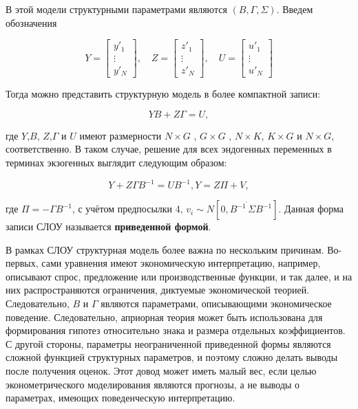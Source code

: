 В этой модели структурными параметрами являются  $(B,\Gamma,\Sigma)$. Введем обозначения

\[
Y=\begin{bmatrix} y'_{1} \\ \vdots \\ y'_{N} \end{bmatrix}, \quad  Z=\begin{bmatrix} z'_{1} \\ \vdots \\ z'_{N} \end{bmatrix}, \quad U=\begin{bmatrix} u'_{1} \\ \vdots \\ u'_{N} \end{bmatrix}
\]

Тогда можно представить структурную модель в более компактной записи:

\begin{equation}
YB+Z\Gamma=U,
\end{equation}

где $Y$,$B$, $Z$,$\Gamma$ и $U$ имеют размерности $N \times G$ , $G \times G$ , $ N \times K$, $K \times G$ и $N \times G$, соответственно. В таком случае, решение для всех эндогенных переменных в терминах экзогенных выглядит следующим образом:


\begin{equation}
Y+Z\Gamma B^{-1}=UB^{-1},
Y=Z\Pi+V,
\end{equation}

где $\Pi= -\Gamma B^{-1}$, с учётом предпосылки 4, $v_{i} \sim N[0,B^{-1^{'}} \Sigma B^{-1}]$. Данная форма записи СЛОУ называется \textbf{приведенной формой}.

	В рамках СЛОУ структурная модель более важна по нескольким причинам. Во-первых, сами уравнения имеют экономическую интерпретацию, например, описывают спрос, предложение или  производственные функции, и так далее, и на них распространяются ограничения, диктуемые экономической теорией. Следовательно, $B$ и $\Gamma$ являются параметрами, описывающими экономическое поведение. Следовательно, априорная теория может быть использована для формирования гипотез относительно знака и размера отдельных коэффициентов. С другой стороны, параметры неограниченной приведенной формы являются сложной функцией структурных параметров, и поэтому сложно делать выводы после получения оценок. Этот довод может иметь малый вес, если целью эконометрического моделирования являются прогнозы, а не выводы о параметрах, имеющих поведенческую интерпретацию.  

